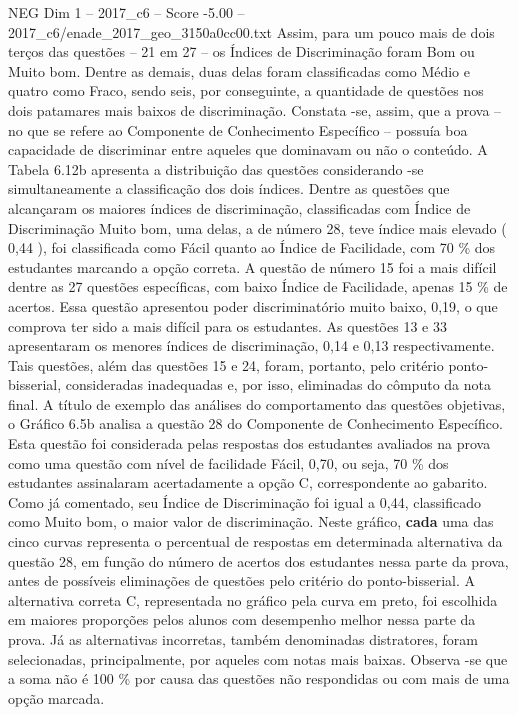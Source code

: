 \begin{textsample}{NEG Dim 1 – 2017\_c6 – Score -5.00 – 2017\_c6/enade\_2017\_geo\_3150a0cc00.txt}
Assim, para um pouco mais de dois terços das questões – 21 em 27 – os Índices de Discriminação foram Bom ou Muito bom.
Dentre as demais, duas delas foram classificadas como Médio e quatro como Fraco, sendo seis, por conseguinte, a quantidade de questões nos dois patamares mais baixos de discriminação.
Constata -se, assim, que a prova – no que se refere ao Componente de Conhecimento Específico – possuía boa capacidade de discriminar entre aqueles que dominavam ou não o conteúdo.
A Tabela 6.12b apresenta a distribuição das questões considerando -se simultaneamente a classificação dos dois índices.
Dentre as questões que alcançaram os maiores índices de discriminação, classificadas com Índice de Discriminação Muito bom, uma delas, a de número 28, teve índice mais elevado ( 0,44 ), foi classificada como Fácil quanto ao Índice de Facilidade, com 70 \% dos estudantes marcando a opção correta.
A questão de número 15 foi a mais difícil dentre as 27 questões específicas, com baixo Índice de Facilidade, apenas 15 \% de acertos.
Essa questão apresentou poder discriminatório muito baixo, 0,19, o que comprova ter sido a mais difícil para os estudantes.
As questões 13 e 33 apresentaram os menores índices de discriminação, 0,14 e 0,13 respectivamente.
Tais questões, além das questões 15 e 24, foram, portanto, pelo critério ponto-bisserial, consideradas inadequadas e, por isso, eliminadas do cômputo da nota final.
A título de exemplo das análises do comportamento das questões objetivas, o Gráfico 6.5b analisa a questão 28 do Componente de Conhecimento Específico.
Esta questão foi considerada pelas respostas dos estudantes avaliados na prova como uma questão com nível de facilidade Fácil, 0,70, ou seja, 70 \% dos estudantes assinalaram acertadamente a opção C, correspondente ao gabarito.
Como já comentado, seu Índice de Discriminação foi igual a 0,44, classificado como Muito bom, o maior valor de discriminação.
Neste gráfico, \textbf{cada} uma das cinco curvas representa o percentual de respostas em determinada alternativa da questão 28, em função do número de acertos dos estudantes nessa parte da prova, antes de possíveis eliminações de questões pelo critério do ponto-bisserial.
A alternativa correta C, representada no gráfico pela curva em preto, foi escolhida em maiores proporções pelos alunos com desempenho melhor nessa parte da prova.
Já as alternativas incorretas, também denominadas distratores, foram selecionadas, principalmente, por aqueles com notas mais baixas.
Observa -se que a soma não é 100 \% por causa das questões não respondidas ou com mais de uma opção marcada.

\end{textsample}
